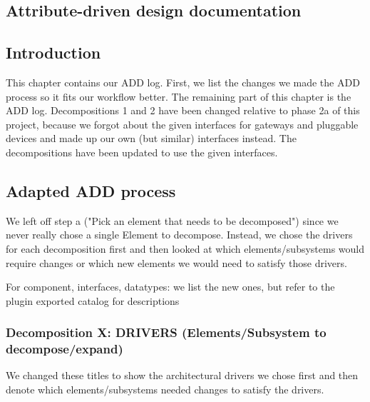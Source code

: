 \documentclass[english]{sareport}
\begin{document}
\begin{appendices}
\chapter{Attribute-driven design documentation}\label{sec:add}
    \section{Introduction}
        This chapter contains our ADD log. First, we list the changes we
        made the ADD process so it fits our workflow better. The remaining part
        of this chapter is the ADD log. Decompositions 1 and 2 have been changed
        relative to phase 2a of this project, because we forgot about the given
        interfaces for gateways and pluggable devices and made up our own
        (but similar) interfaces instead. The decompositions have been updated
        to use the given interfaces.

    \section{Adapted ADD process}
        We left off step a ("Pick an element that needs to be decomposed") since we
        never really chose a single Element to decompose. Instead, we chose the drivers
        for each decomposition first and then looked at which elements/subsystems
        would require changes or which new elements we would need to satisfy those drivers.

        For component, interfaces, datatypes: we list the new ones, but refer
        to the plugin exported catalog for descriptions

        \subsection{Decomposition X: DRIVERS (Elements/Subsystem to decompose/expand)}
            We changed these titles to show the architectural drivers we chose first and then
            denote which elements/subsystems needed changes to satisfy the drivers.



\end{appendices}
\end{document}

